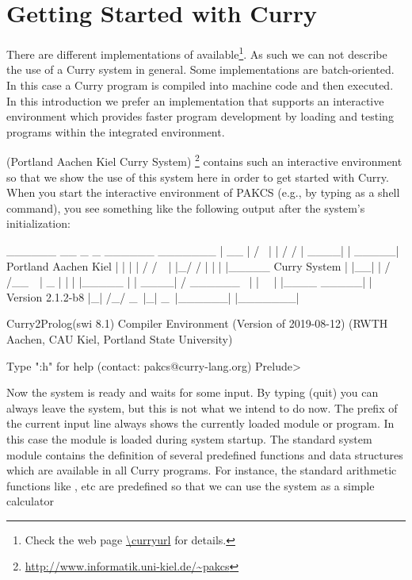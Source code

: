 \chapter{Getting Started with Curry}

There are different implementations of \curryref{}
available\footnote{Check the web page \url{\curryurl} for details.}.
As such we can not describe the use of a Curry system
in general. Some implementations are batch-oriented.  In this case a 
Curry program is compiled into machine code and then executed. 
In this introduction we prefer an implementation that supports an interactive environment which provides faster program development by loading and testing programs within the integrated environment.

\pakcs{} (Portland Aachen Kiel Curry System)
\cite{Hanus19PAKCS}\footnote{\url{http://www.informatik.uni-kiel.de/~pakcs}}
contains such an interactive environment so that we show the use
of this system here in order to get started with Curry.
When you start the interactive environment of PAKCS
(e.g., by typing 
as a shell command),
you see something like the following output after the system's
initialization:
\begin{curry}
  ______      __       _    _    ______   _______     
 |  __  |    /  \     | |  / /  |  ____| |  _____|   Portland Aachen Kiel
 | |  | |   / /\ \    | |_/ /   | |      | |_____    Curry System
 | |__| |  / /__\ \   |  _  |   | |      |_____  |   
 |  ____| / ______ \  | | \ \   | |____   _____| |   Version 2.1.2-b8
 |_|     /_/      \_\ |_|  \_\  |______| |_______|   

Curry2Prolog(swi 8.1) Compiler Environment (Version of 2019-08-12)
(RWTH Aachen, CAU Kiel, Portland State University)

Type ":h" for help (contact: pakcs@curry-lang.org)
Prelude> 
\end{curry}
Now the system is ready and waits for some input.
By typing  (quit) you can always leave the system,
but this is not what we intend to do now.
The prefix of the current input line always shows the currently
loaded module or program. In this case the module
is loaded during system startup.
The standard system module  contains
the definition of several predefined functions and data structures
which are available in all Curry programs.
For instance, the standard arithmetic functions like \code{+}, \code{*} etc
are predefined so that we can use the system as a simple calculator
